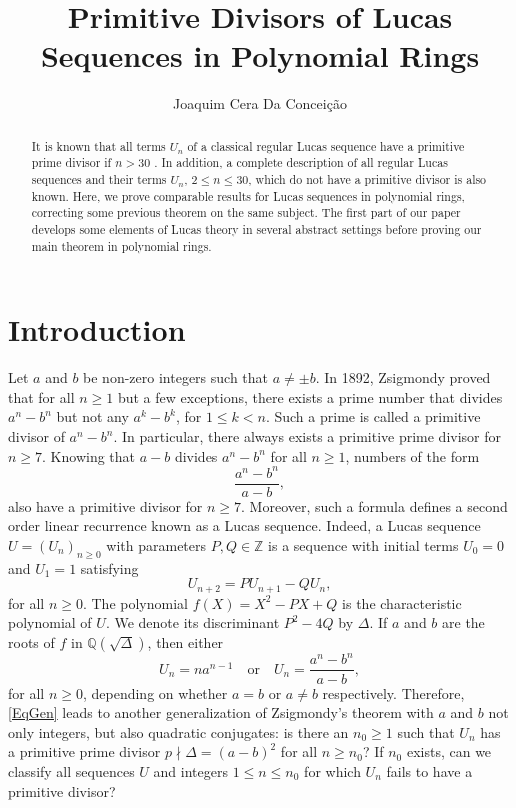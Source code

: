 \documentclass[reqno]{amsart}
\title{Primitive Divisors of Lucas Sequences in Polynomial Rings}
\author{Joaquim Cera Da Concei\c c\~ao}
\begin{document}
\begin{abstract}
It is known that all terms $U_n$ of a classical regular Lucas sequence have a primitive prime
divisor if $n>30$ \cite{BHV}. In addition, a complete description of all regular Lucas sequences and their
terms $U_n$, $2\leq n\leq 30$, which do not have a primitive divisor is also known. Here, we prove 
comparable results for Lucas sequences in polynomial rings, correcting some previous theorem
on the same subject. The first part of our paper develops some elements of Lucas theory in
several abstract settings before proving our main theorem in polynomial rings.
\end{abstract}

\maketitle
\tableofcontents

\section{Introduction}

Let $a$ and $b$ be non-zero integers such that $a\ne \pm b$. In 1892, Zsigmondy \cite{Zsi} proved that for all $n\geq 1$ but a few exceptions, there exists a prime number that divides $a^n-b^n$ but not any $a^k-b^k$, for $1\leq k <n$. Such a prime is called a primitive divisor of $a^n-b^n$. In particular, there always exists a primitive prime divisor for $n\geq 7$. Knowing that $a-b$ divides $a^n-b^n$ for all $n\geq 1$, numbers of the form
\begin{equation}\label{EqGen}
    \frac{a^n-b^n}{a-b},
\end{equation}
also have a primitive divisor for $n\geq 7$. Moreover, such a formula defines a second order linear recurrence known as a Lucas sequence. Indeed, a Lucas sequence $U=(U_n)_{n\geq 0}$ with parameters $P,Q\in\mathbb{Z}$ is a sequence with initial terms $U_0=0$ and $U_1=1$ satisfying
\[
U_{n+2}=PU_{n+1}-QU_n,
\]
for all $n\geq 0$. The polynomial $f(X)=X^2-PX+Q$ is the characteristic polynomial of $U$. We denote its discriminant $P^2-4Q$ by $\Delta$. If $a$ and $b$ are the roots of $f$ in $\mathbb{Q}(\sqrt{\Delta})$, then either
\[
U_n=na^{n-1} \quad \text{or} \quad U_n=\frac{a^n-b^n}{a-b},
\]
for all $n\geq 0$, depending on whether $a= b$ or $a\ne b$ respectively. Therefore, \eqref{EqGen} leads to another generalization of Zsigmondy's theorem with $a$ and $b$ not only integers, but also quadratic conjugates: is there an $n_0\geq 1$ such that $U_n$ has a primitive prime divisor $p\nmid \Delta = (a-b)^2$ for all $n\geq n_0$? If $n_0$ exists, can we classify all sequences $U$ and integers $1\leq n\leq n_0$ for which $U_n$ fails to have a primitive divisor?
\end{document}
